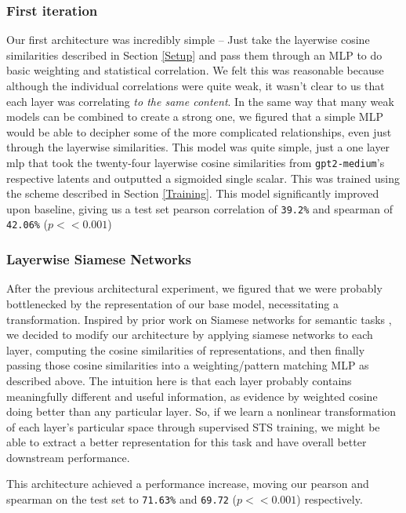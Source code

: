 \documentclass{article}
\begin{document}
\subsubsection{First iteration}
Our first architecture was incredibly simple -- Just take the layerwise cosine similarities described in Section \ref {Setup} and pass them through an MLP to do basic weighting and statistical correlation. We felt this was reasonable because although the individual correlations were quite weak, it wasn't clear to us that each layer was correlating \textit{to the same content}. In the same way that many weak models can be combined to create a strong one, we figured that a simple MLP would be able to decipher some of the more complicated relationships, even just through the layerwise similarities. This model was quite simple, just a one layer mlp that took the twenty-four layerwise cosine similarities from \verb|gpt2-medium|'s respective latents and outputted a sigmoided single scalar. This was trained using the scheme described in Section \ref{Training}. This model significantly improved upon baseline, giving us a test set pearson correlation of \verb|39.2%| and spearman of \verb|42.06%| ($p<< 0.001$)

\subsubsection{Layerwise Siamese Networks}
After the previous architectural experiment, we figured that we were probably bottlenecked by the representation of our base model, necessitating a transformation. Inspired by prior work on Siamese networks for semantic tasks \cite{reimers2019sentencebertsentenceembeddingsusing}, we decided to modify our architecture by applying siamese networks to each layer, computing the cosine similarities of  representations, and then finally passing those cosine similarities into a weighting/pattern matching MLP as described above. The intuition here is that each layer probably contains meaningfully different and useful information, as evidence by weighted cosine doing better than any particular layer. So, if we learn a nonlinear transformation of each layer's particular space through supervised STS training, we might be able to extract a better representation for this task and have overall better downstream performance.

This architecture achieved a  performance increase, moving our pearson and spearman on the test set to \verb|71.63%| and \verb|69.72| ($p << 0.001$) respectively.
\end{document}
